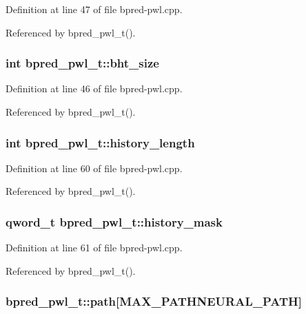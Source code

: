 Definition at line 47 of file bpred-pwl.cpp.

Referenced by bpred\_\-pwl\_\-t().
\subsubsection[{bht\_\-size}]{\setlength{\rightskip}{0pt plus 5cm}int {\bf bpred\_\-pwl\_\-t::bht\_\-size}\hspace{0.3cm}{\tt  [protected]}}\label{classbpred__pwl__t_708682e0901ebd4d6433367c741e933f}




Definition at line 46 of file bpred-pwl.cpp.

Referenced by bpred\_\-pwl\_\-t().
\subsubsection[{history\_\-length}]{\setlength{\rightskip}{0pt plus 5cm}int {\bf bpred\_\-pwl\_\-t::history\_\-length}\hspace{0.3cm}{\tt  [protected]}}\label{classbpred__pwl__t_dadeb4229d73084659bc2ecba3952094}




Definition at line 60 of file bpred-pwl.cpp.

Referenced by bpred\_\-pwl\_\-t().
\subsubsection[{history\_\-mask}]{\setlength{\rightskip}{0pt plus 5cm}qword\_\-t {\bf bpred\_\-pwl\_\-t::history\_\-mask}\hspace{0.3cm}{\tt  [protected]}}\label{classbpred__pwl__t_08e24933aa268534fa5369cb119e138f}




Definition at line 61 of file bpred-pwl.cpp.

Referenced by bpred\_\-pwl\_\-t().
\subsubsection[{path}]{ {\bf bpred\_\-pwl\_\-t::path}[MAX\_\-PATHNEURAL\_\-PATH]\hspace{0.3cm}{\tt  [protected]}}\label{classbpred__pwl__t_252614443b2d97a574153dedd7f2ec71}




